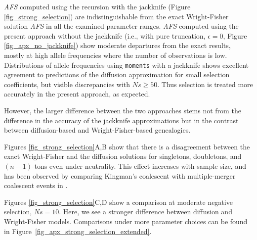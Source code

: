 \documentclass[9pt,twocolumn,twoside,lineno]{gsajnl}
\begin{document}
\textit{AFS} computed using the recursion with the jackknife (Figure \ref{fig_strong_selection}) are 
indistinguishable from the exact Wright-Fisher solution \textit{AFS} in all the examined 
parameter ranges. \textit{AFS} computed using the present approach without the jackknife 
(i.e., with pure truncation, $\epsilon = 0$, Figure \ref{fig_apx_no_jackknife}) show moderate departures from the exact results, 
mostly at high allele frequencies where the number of observations is low. 
Distributions of allele frequencies using \texttt{moments} with a jackknife shows 
excellent agreement to predictions of the diffusion approximation for small selection 
coefficients, but visible discrepancies with $Ns\ge 50.$ Thus selection is treated more 
accurately in the present approach, as expected. 


However, the larger difference between the two approaches stems not from the difference in the accuracy of the jackknife approximations but in the
contrast between diffusion-based and Wright-Fisher-based genealogies.

Figures \ref{fig_strong_selection}A,B show that there is a disagreement between the exact
Wright-Fisher and the diffusion solutions for singletons, doubletons, and $(n-1)$-tons even under neutrality. 
This effect increases with sample size, and has been observed by comparing
Kingman's coalescent with multiple-merger coalescent events in \citep{Fu2006, BhaskarEtAl2014}.



Figures \ref{fig_strong_selection}C,D show a comparison at moderate negative selection, $Ns=10$.
Here, we see a stronger difference between diffusion and Wright-Fisher models. 
Comparisons under more parameter choices can be found in  Figure~\ref{fig_apx_strong_selection_extended}.
\end{document}
